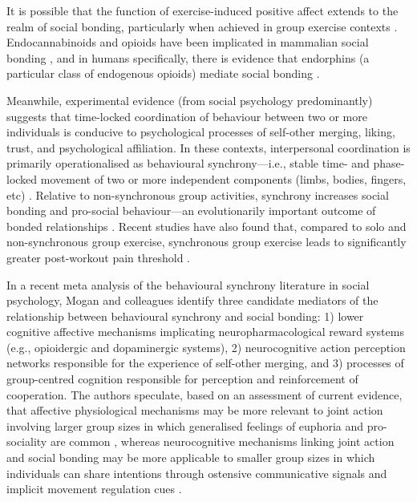 \begin{CJK}{UTF8}{gbsn}
It is possible that the function of exercise-induced positive affect extends to the realm of social bonding, particularly when achieved in group exercise contexts \citep{Cohen2009,Machin2011}.  Endocannabinoids and opioids have been implicated in mammalian social bonding \citep{Fattore2010,Keverne1989}, and in humans specifically, there is evidence that endorphins (a particular class of endogenous opioids) mediate social bonding \citep{Dunbar2012,Shultz2010}.

Meanwhile, experimental evidence (from social psychology predominantly) suggests that time-locked coordination of behaviour between two or more individuals is conducive to psychological processes of self-other merging, liking, trust, and psychological affiliation.  In these contexts, interpersonal coordination is primarily operationalised as behavioural synchrony---i.e., stable time- and phase-locked movement of two or more independent components (limbs, bodies, fingers, etc) \citep{Pikovsky2007}.  Relative to non-synchronous group activities, synchrony increases social bonding and pro-social behaviour---an evolutionarily important outcome of bonded relationships \citep{Reddish2013,Reddish2013a,Wiltermuth2009}.  Recent studies have also found that, compared to solo and non-synchronous group exercise, synchronous group exercise leads to significantly greater post-workout pain threshold \citep{Cohen2009,Sullivan2014,Sullivan2013a, Sullivan2013b}.

In a recent meta analysis of the behavioural synchrony literature in social psychology, Mogan and colleagues \textcite{Mogan2017} identify three candidate mediators of the relationship between behavioural synchrony and social bonding: 1) lower cognitive affective mechanisms implicating neuropharmacological reward systems (e.g., opioidergic and dopaminergic systems), 2) neurocognitive action perception networks responsible for the experience of self-other merging, and 3) processes of group-centred cognition responsible for perception and reinforcement of cooperation.  The authors speculate, based on an assessment of current evidence, that affective physiological mechanisms may be more relevant to joint action involving larger group sizes in which generalised feelings of euphoria and pro-sociality are common \citep[][e.g., mass religious rituals or music festivals]{Weinstein2016}, whereas neurocognitive mechanisms linking joint action and social bonding may be more applicable to smaller group sizes in which individuals can share intentions through ostensive communicative signals and implicit movement regulation cues \citep{Semin2008,Frith2010}.


\end{CJK}
